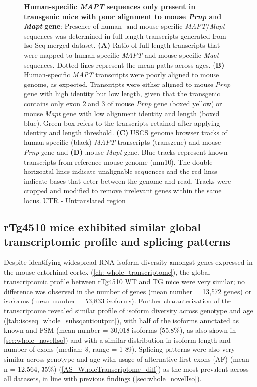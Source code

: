 \begin{figure}[htp]
	{\textbf{Human-specific \textit{MAPT} sequences only present in transgenic mice with poor alignment to mouse \textit{Prnp} and \textit{Mapt} gene}: Presence of human- and mouse-specific \textit{MAPT}/\textit{Mapt} sequences was determined in full-length transcripts generated from Iso-Seq merged dataset. \textbf{(A)} Ratio of full-length transcripts that were mapped to human-specific \textit{MAPT} and mouse-specific \textit{Mapt} sequences. Dotted lines represent the mean paths across ages. \textbf{(B)} Human-specific \textit{MAPT} transcripts were poorly aligned to mouse genome, as expected. Transcripts were either aligned to mouse \textit{Prnp} gene with high identity but low length, given that the transgenic contains only exon 2 and 3 of mouse \textit{Prnp} gene\cite{Ramsden2005} (boxed yellow) or  mouse \textit{Mapt} gene with low alignment identity and length (boxed blue). Green box refers to the transcripts retained after applying identity and length threshold. \textbf{(C)} USCS genome browser tracks of human-specific (black) \textit{MAPT} transcripts (transgene) and mouse \textit{Prnp} gene and \textbf{(D)} mouse \textit{Mapt} gene. Blue tracks represent known transcripts from reference mouse genome (mm10). The double horizontal lines indicate unalignable sequences and the red lines indicate bases that deter between the genome and read. Tracks were cropped and modified to remove irrelevant genes within the same locus.  UTR - Untranslated region}
	\label{fig:isoseq_humanmapt}
\end{figure}

\clearpage
\subsection{rTg4510 mice exhibited similar global transcriptomic profile and splicing patterns}
Despite identifying widespread RNA isoform diversity amongst genes expressed in the mouse entorhinal cortex (\cref{ch: whole_transcriptome}), the global transcriptomic profile between rTg4510 WT and TG mice were very similar; no difference was observed in the number of genes (mean number = 13,572 genes) or isoforms (mean number = 53,833 isoforms). Further characterisation of the transcriptome revealed similar profile of isoform diversity across genotype and age (\cref{tab:isoseq_whole_subsqantioutput}), with half of the isoforms annotated as known and FSM (mean number = 30,018 isoforms (55.8\%), as also shown in \cref{sec:whole_novelIso}) and with a similar distribution in isoform length and number of exons (median: 8, range = 1-89). Splicing patterns were also very similar across genotype and age with usage of alternative first exons (AF) (mean n = 12,564, 35\%) (\cref{AS_WholeTranscriptome_diff}) as the most prevalent across all datasets, in line with previous findings (\cref{sec:whole_novelIso}).

